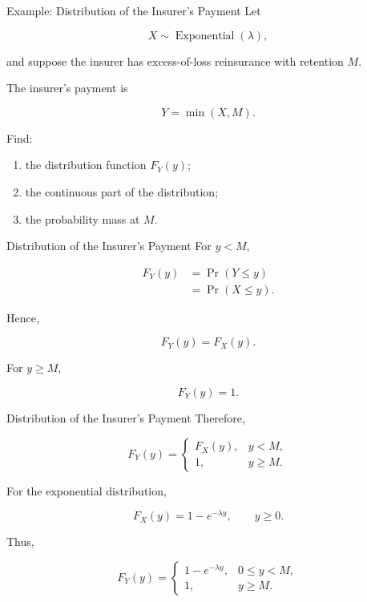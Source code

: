 \documentclass[
  ignorenonframetext,
  aspectratio=169,
]{beamer}
\providecommand{\tightlist}{%
  \setlength{\itemsep}{0pt}\setlength{\parskip}{0pt}}
\begin{document}
\begin{frame}{Example: Distribution of the Insurer's Payment}
\protect{}\label{example-distribution-of-the-insurers-payment-1}
Let

\[
X\sim\operatorname{Exponential}(\lambda),
\]

and suppose the insurer has excess-of-loss reinsurance with retention
\(M\).

The insurer's payment is

\[
Y=\min(X,M).
\]

Find:

\begin{enumerate}
\tightlist
\item
  the distribution function \(F_Y(y)\);
\item
  the continuous part of the distribution;
\item
  the probability mass at \(M\).
\end{enumerate}
\end{frame}

\begin{frame}{Distribution of the Insurer's Payment}
\protect{}\label{distribution-of-the-insurers-payment}
For \(y<M\),

\[
\begin{aligned}
F_Y(y)
&=\Pr(Y\leq y)\\
&=\Pr(X\leq y).
\end{aligned}
\]

Hence,

\[
F_Y(y)=F_X(y).
\]

For \(y\geq M\),

\[
F_Y(y)=1.
\]
\end{frame}

\begin{frame}{Distribution of the Insurer's Payment}
\protect{}\label{distribution-of-the-insurers-payment-1}
Therefore,

\[
\boxed{
F_Y(y)=
\begin{cases}
F_X(y), & y<M,\\
1, & y\geq M.
\end{cases}
}
\]

For the exponential distribution,

\[
F_X(y)=1-e^{-\lambda y},
\qquad y\geq0.
\]

Thus,

\[
F_Y(y)=
\begin{cases}
1-e^{-\lambda y}, & 0\leq y<M,\\
1, & y\geq M.
\end{cases}
\]
\end{frame}
\end{document}

